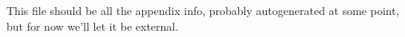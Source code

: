 This file should be all the appendix info, probably autogenerated at some point, but for now we'll let it be external.